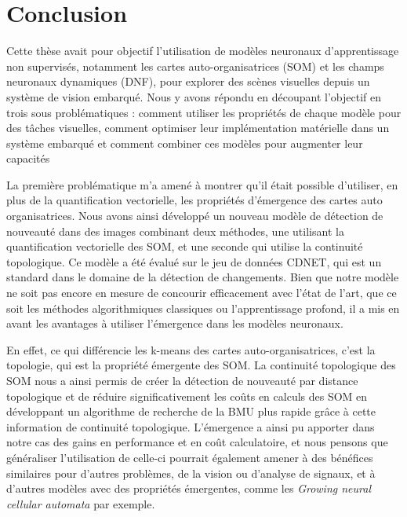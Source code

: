 \chapter*{Conclusion}

Cette thèse avait pour objectif l'utilisation de modèles neuronaux d'apprentissage non supervisés, notamment les cartes auto-organisatrices (SOM) et les champs neuronaux dynamiques (DNF), pour explorer des scènes visuelles depuis un système de vision embarqué. Nous y avons répondu en découpant l'objectif en trois sous problématiques : comment utiliser les propriétés de chaque modèle pour des tâches visuelles, comment optimiser leur implémentation matérielle dans un système embarqué et comment combiner ces modèles pour augmenter leur capacités

La première problématique m'a amené à montrer qu'il était possible d'utiliser, en plus de la quantification vectorielle, les propriétés d'émergence des cartes auto organisatrices. Nous avons ainsi développé un nouveau modèle de détection de nouveauté dans des images combinant deux méthodes, une utilisant la quantification vectorielle des SOM, et une seconde qui utilise la continuité topologique. Ce modèle a été évalué sur le jeu de données CDNET, qui est un standard dans le domaine de la détection de changements. Bien que notre modèle ne soit pas encore en mesure de concourir efficacement avec l'état de l'art, que ce soit les méthodes algorithmiques classiques ou l'apprentissage profond, il a mis en avant les avantages à utiliser l'émergence dans les modèles neuronaux.

En effet, ce qui différencie les k-means des cartes auto-organisatrices, c'est la topologie, qui est la propriété émergente des SOM. La continuité topologique des SOM nous a ainsi permis de créer la détection de nouveauté par distance topologique et de réduire significativement les coûts en calculs des SOM en développant un algorithme de recherche de la BMU plus rapide grâce à cette information de continuité topologique. L'émergence a ainsi pu apporter dans notre cas des gains en performance et en coût calculatoire, et nous pensons que généraliser l'utilisation de celle-ci pourrait également amener à des bénéfices similaires pour d'autres problèmes, de la vision ou d'analyse de signaux, et à d'autres modèles avec des propriétés émergentes, comme les \textit{Growing neural cellular automata} \cite{mordvintsev2020growing} par exemple.

